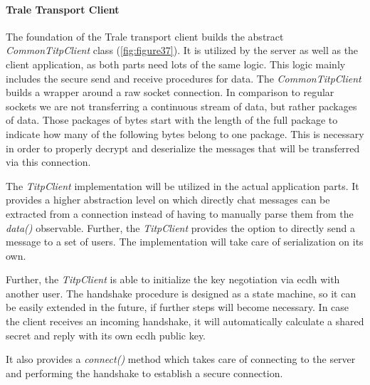 \paragraph{Trale Transport Client}
The foundation of the Trale transport client builds the abstract \textit{CommonTitpClient} class (\ref{fig:figure37}).
It is utilized by the server as well as the client application, as both parts need lots of the same logic.
This logic mainly includes the secure send and receive procedures for data.
The \textit{CommonTitpClient} builds a wrapper around a raw socket connection.
In comparison to regular sockets we are not transferring a continuous stream of data, but rather packages of data.
Those packages of bytes start with the length of the full package to indicate how many of the following bytes belong to
one package.
This is necessary in order to properly decrypt and deserialize the messages that will be transferred via this
connection.

The \textit{TitpClient} implementation will be utilized in the actual application parts.
It provides a higher abstraction level on which directly chat messages can be extracted from a connection instead of
having to manually parse them from the \textit{data()} observable.
Further, the \textit{TitpClient} provides the option to directly send a message to a set of users.
The implementation will take care of serialization on its own.

Further, the \textit{TitpClient} is able to initialize the key negotiation via \ac{ecdh} with another user.
The handshake procedure is designed as a state machine, so it can be easily extended in the future, if further steps will
become necessary.
In case the client receives an incoming handshake, it will automatically calculate a shared secret and reply with its
own \ac{ecdh} public key.

It also provides a \textit{connect()} method which takes care of connecting to the server and performing the handshake
to establish a secure connection.

